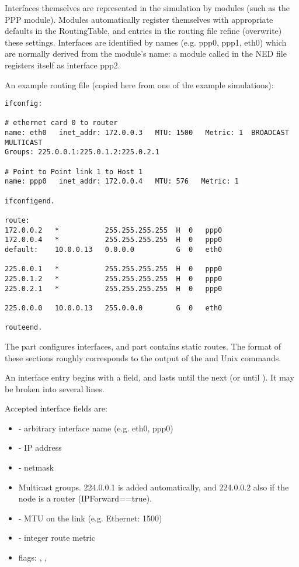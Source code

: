 Interfaces themselves are represented in the simulation by modules
(such as the PPP module). Modules automatically register themselves
with appropriate defaults in the RoutingTable, and entries in the
routing file refine (overwrite) these settings.
Interfaces are identified by names (e.g. ppp0, ppp1, eth0) which
are normally derived from the module's name: a module called
 in the NED file registers itself as interface ppp2.

An example routing file (copied here from one of the example simulations):

\begin{verbatim}
ifconfig:

# ethernet card 0 to router
name: eth0   inet_addr: 172.0.0.3   MTU: 1500   Metric: 1  BROADCAST MULTICAST
Groups: 225.0.0.1:225.0.1.2:225.0.2.1

# Point to Point link 1 to Host 1
name: ppp0   inet_addr: 172.0.0.4   MTU: 576   Metric: 1

ifconfigend.

route:
172.0.0.2   *           255.255.255.255  H  0   ppp0
172.0.0.4   *           255.255.255.255  H  0   ppp0
default:    10.0.0.13   0.0.0.0          G  0   eth0

225.0.0.1   *           255.255.255.255  H  0   ppp0
225.0.1.2   *           255.255.255.255  H  0   ppp0
225.0.2.1   *           255.255.255.255  H  0   ppp0

225.0.0.0   10.0.0.13   255.0.0.0        G  0   eth0

routeend.
\end{verbatim}

The  part configures interfaces,
and  part contains static routes.
The format of these sections roughly corresponds to the output
of the  and  Unix commands.

An interface entry begins with a  field, and lasts until
the next  (or until ). It may
be broken into several lines.

Accepted interface fields are:

\begin{itemize}
  \item {} - arbitrary interface name (e.g. eth0, ppp0)
  \item {} - IP address
  \item {} - netmask
  \item {} Multicast groups. 224.0.0.1 is added automatically,
     and 224.0.0.2 also if the node is a router (IPForward==true).
  \item {} - MTU on the link (e.g. Ethernet: 1500)
  \item {} - integer route metric
  \item flags: , , 
\end{itemize}

